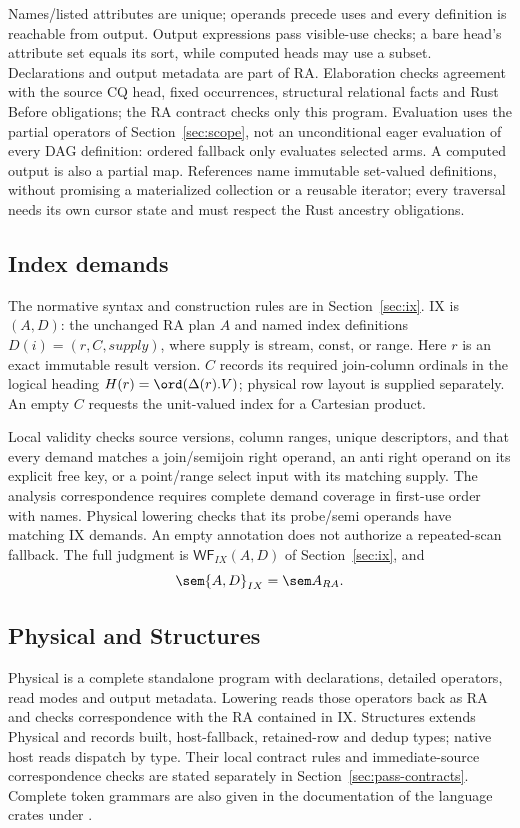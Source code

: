 Names/listed attributes are unique; operands precede uses and every definition
is reachable from output. Output expressions pass visible-use checks; a bare
head's attribute set equals its sort, while computed heads may use a subset.
Declarations and output metadata are part of RA. Elaboration checks agreement
with the source CQ head, fixed occurrences, structural relational facts and
Rust Before obligations; the RA contract checks only this program.
Evaluation uses the partial operators of Section~\ref{sec:scope}, not an
unconditional eager evaluation of every DAG definition: ordered fallback
only evaluates selected arms. A computed output is also a partial map.
References name immutable set-valued definitions, without promising a
materialized collection or a reusable iterator; every traversal needs its
own cursor state and must respect the Rust ancestry obligations.
\subsection{Index demands}
The normative syntax and construction rules are in
Section~\ref{sec:ix}. IX is $(A,D)$: the unchanged RA
plan $A$ and named index definitions $D(i)=(r,C,supply)$, where supply is
stream, const, or range. Here $r$ is an
exact immutable result version. $C$ records its required join-column ordinals
in the logical heading $H(r)=\ord(\Delta(r).V)$; physical row layout is supplied
separately. An empty $C$ requests the unit-valued index for a Cartesian product.

Local validity checks source versions, column ranges, unique descriptors,
and that every demand matches a join/semijoin right operand, an anti right
operand on its explicit free key, or a point/range select input with its
matching supply.
The analysis correspondence requires complete demand coverage in first-use
order with  names. Physical lowering
checks that its probe/semi operands have matching IX demands.
An empty annotation does not authorize a repeated-scan fallback.
The full judgment is $\mathsf{WF}_{IX}(A,D)$
of Section~\ref{sec:ix}, and
\[
 \sem{A,D}_{IX}=\sem A_{RA}.
\]
\subsection{Physical and Structures}
Physical is a complete standalone program with declarations, detailed operators,
read modes and output metadata. Lowering reads those operators back as RA and
checks correspondence with the RA contained in IX. Structures extends Physical
and records built, host-fallback, retained-row and dedup types; native host
reads dispatch by type. Their local
contract rules and immediate-source correspondence checks are stated separately
in Section~\ref{sec:pass-contracts}. Complete token grammars are also given in
the documentation of the language crates under .

